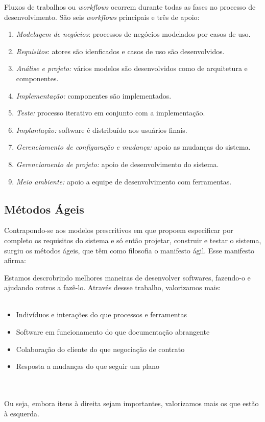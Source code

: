 Fluxos de trabalhos ou \emph{workflows} ocorrem durante todas as
fases no processo de desenvolvimento. São seis \emph{workflows} principais
e três de apoio:
\begin{enumerate}
  \item \emph{Modelagem de negócios}: processos de negócios modelados por
  casos de uso.
  \item \emph{Requisitos}: atores são idenficados e casos de uso são desenvolvidos.
  \item \emph{Análise e projeto: }vários modelos são desenvolvidos como de
  arquitetura e componentes.
  \item \emph{Implementação: }componentes são implementados.
  \item \emph{Teste: }processo iterativo em conjunto com a implementação.
  \item \emph{Implantação: }software é distribuído aos usuários finais.
  \item \emph{Gerenciamento de configuração e mudança: }apoio as mudanças
  do sistema.
  \item \emph{Gerenciamento de projeto: }apoio de desenvolvimento do sistema.
  \item \emph{Meio ambiente: }apoio a equipe de desenvolvimento com ferramentas.
\end{enumerate}

\subsection{Métodos Ágeis}

Contrapondo-se aos modelos prescritivos em que propoem especificar por completo
os requisitos do sistema e só então projetar, construir e testar o sistema, surgiu
os métodos ágeis, que têm como filosofia o manifesto ágil. Esse manifesto afirma:

\begin{citacao}
  Estamos descrobrindo melhores maneiras de desenvolver softwares, fazendo-o e ajudando
  outros a fazê-lo. Através dessse trabalho, valorizamos mais:\\\\
  \begin{minipage}{15cm}
    \begin{itemize}
      \item Indivíduos e interações do que processos e ferramentas
      \item Software em funcionamento do que documentação abrangente
      \item Colaboração do cliente do que negociação de contrato
      \item Resposta a mudanças do que seguir um plano
    \end{itemize}
  \end{minipage}\\\\
  Ou seja, embora itens à direita sejam importantes, valorizamos mais os que estão à esquerda.
\end{citacao}

